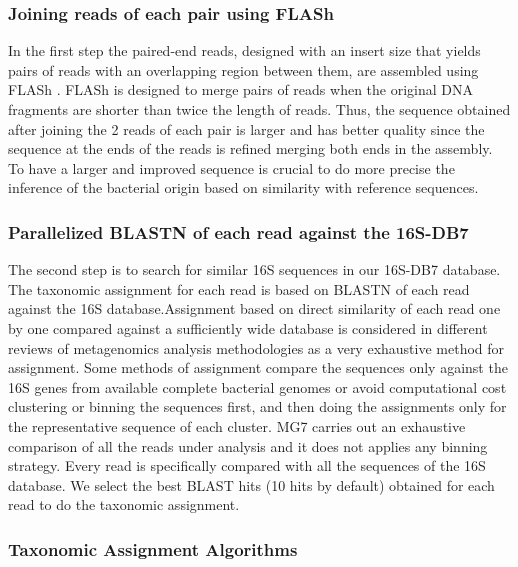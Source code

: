 \documentclass[fontsize=8pt,paper=a4,pagesize,abstracton]{scrartcl}
\begin{document}
\subsubsection{Joining reads of each pair using
FLASh}\label{joining-reads-of-each-pair-using-flash}

In the first step the paired-end reads, designed with an insert size
that yields pairs of reads with an overlapping region between them, are
assembled using FLASh \autocite{magovc2011flash}. FLASh is designed to
merge pairs of reads when the original DNA fragments are shorter than
twice the length of reads. Thus, the sequence obtained after joining the
2 reads of each pair is larger and has better quality since the sequence
at the ends of the reads is refined merging both ends in the assembly.
To have a larger and improved sequence is crucial to do more precise the
inference of the bacterial origin based on similarity with reference
sequences.

\subsubsection{Parallelized BLASTN of each read against the
16S-DB7}\label{parallelized-blastn-of-each-read-against-the-16s-db7}

The second step is to search for similar 16S sequences in our 16S-DB7
database. The taxonomic assignment for each read is based on BLASTN of
each read against the 16S database.Assignment based on direct similarity
of each read one by one compared against a sufficiently wide database is
considered in different reviews of metagenomics analysis methodologies
\autocite{segata2013computational} \autocite{morgan2012chapter} as a
very exhaustive method for assignment. Some methods of assignment
compare the sequences only against the 16S genes from available complete
bacterial genomes or avoid computational cost clustering or binning the
sequences first, and then doing the assignments only for the
representative sequence of each cluster. MG7 carries out an exhaustive
comparison of all the reads under analysis and it does not applies any
binning strategy. Every read is specifically compared with all the
sequences of the 16S database. We select the best BLAST hits (10 hits by
default) obtained for each read to do the taxonomic assignment.

\subsubsection{Taxonomic Assignment
Algorithms}\label{taxonomic-assignment-algorithms}
\end{document}
